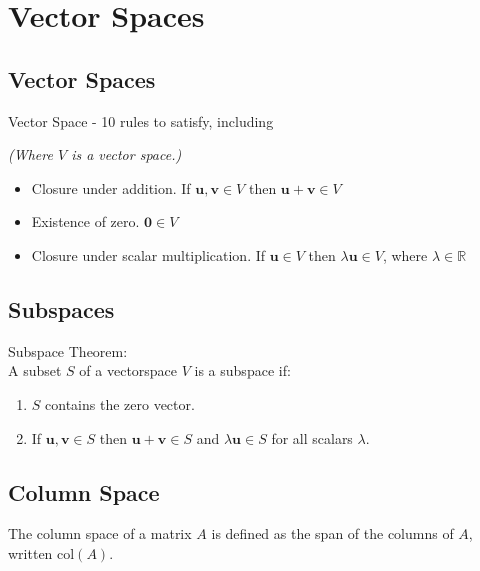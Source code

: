 \documentclass[a4paper,10pt]{article}
\begin{document}
\section*{Vector Spaces}
\subsection*{Vector Spaces}
Vector Space - 10 rules to satisfy, including \begin{small}\textit{(Where $V$ is a vector space.)}\end{small}
\begin{itemize}
\item Closure under addition. If $\mathbf{u}, \mathbf{v} \in V$ then $\mathbf{u} + \mathbf{v} \in V$
\item Existence of zero. $\mathbf{0} \in V$
\item Closure under scalar multiplication. If $\mathbf{u} \in V$ then $\lambda \mathbf{u} \in V$, where $\lambda \in \mathbb{R}$
\end{itemize}

\subsection*{Subspaces}
Subspace Theorem:\\
  A subset $S$ of a vectorspace $V$ is a subspace if:
\begin{enumerate}
\renewcommand{\labelenumi}{\roman{enumi})}
\item $S$ contains the zero vector.
\item If $\mathbf{u}, \mathbf{v} \in S$ then $\mathbf{u} + \mathbf{v} \in S$ and $\lambda \mathbf{u} \in S$ for all scalars $\lambda$.
\end{enumerate}

\subsection*{Column Space}
The column space of a matrix $A$ is defined as the span of the columns of $A$, written $\mbox{col}(A)$.
\end{document}
